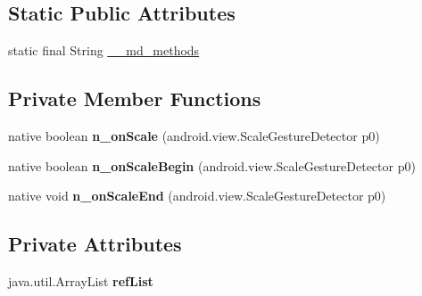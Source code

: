 \subsection*{Static Public Attributes}
\begin{DoxyCompactItemize}
\item 
static final String \hyperlink{classmd5b60ffeb829f638581ab2bb9b1a7f4f3f_1_1InnerScaleListener_ae1c1d8dc7c8fd6e763b6ea898d8955fd}{\+\_\+\+\_\+md\+\_\+methods}
\end{DoxyCompactItemize}
\subsection*{Private Member Functions}
\begin{DoxyCompactItemize}
\item 
\mbox{\label{classmd5b60ffeb829f638581ab2bb9b1a7f4f3f_1_1InnerScaleListener_a91faa282db003e8926259969696d9b9e}} 
native boolean {\bfseries n\+\_\+on\+Scale} (android.\+view.\+Scale\+Gesture\+Detector p0)
\item 
\mbox{\label{classmd5b60ffeb829f638581ab2bb9b1a7f4f3f_1_1InnerScaleListener_ab86d54aeb6cce4d552b0d578483a070f}} 
native boolean {\bfseries n\+\_\+on\+Scale\+Begin} (android.\+view.\+Scale\+Gesture\+Detector p0)
\item 
\mbox{\label{classmd5b60ffeb829f638581ab2bb9b1a7f4f3f_1_1InnerScaleListener_a43f4b9e4648733eb24555ee18fffa626}} 
native void {\bfseries n\+\_\+on\+Scale\+End} (android.\+view.\+Scale\+Gesture\+Detector p0)
\end{DoxyCompactItemize}
\subsection*{Private Attributes}
\begin{DoxyCompactItemize}
\item 
\mbox{\label{classmd5b60ffeb829f638581ab2bb9b1a7f4f3f_1_1InnerScaleListener_a0542c47f216a6c8a1867c887ac1f9cce}} 
java.\+util.\+Array\+List {\bfseries ref\+List}
\end{DoxyCompactItemize}


